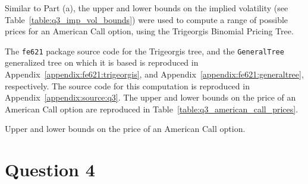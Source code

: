 \documentclass[10pt]{article}
\begin{document}
Similar to Part (a), the upper and lower bounds on the implied volatility (see Table~\ref{table:q3_imp_vol_bounds}) were used to compute a range of possible prices for an American Call option, using the Trigeorgis Binomial Pricing Tree.

The \texttt{fe621} package source code for the Trigeorgis tree, and the \texttt{GeneralTree} generalized tree on which it is based is reproduced in Appendix~\ref{appendix:fe621:trigeorgis}, and Appendix~\ref{appendix:fe621:generaltree}, respectively. The source code for this computation is reproduced in Appendix~\ref{appendix:source:q3}. The upper and lower bounds on the price of an American Call option are reproduced in Table~\ref{table:q3_american_call_prices}.

\begin{table}[!h]
    \centering
    \caption{Upper and lower bounds on the price of an American Call option.}
    \label{table:q3_american_call_prices}
\end{table}


\newpage
\section{Question 4}

\end{document}
